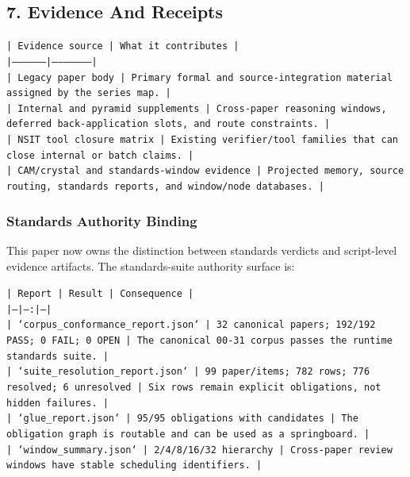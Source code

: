 \documentclass[11pt]{article}
\begin{document}
\subsection*{7. Evidence And Receipts}

\noindent\texttt{| Evidence source | What it contributes |}\\
\noindent\texttt{|-----------------|---------------------|}\\
\noindent\texttt{| Legacy paper body | Primary formal and source-integration material assigned by the series map. |}\\
\noindent\texttt{| Internal and pyramid supplements | Cross-paper reasoning windows, deferred back-application slots, and route constraints. |}\\
\noindent\texttt{| NSIT tool closure matrix | Existing verifier/tool families that can close internal or batch claims. |}\\
\noindent\texttt{| CAM/crystal and standards-window evidence | Projected memory, source routing, standards reports, and window/node databases. |}\\

\subsubsection*{Standards Authority Binding}

This paper now owns the distinction between standards verdicts and script-level
evidence artifacts. The standards-suite authority surface is:

\noindent\texttt{| Report | Result | Consequence |}\\
\noindent\texttt{|---|---:|---|}\\
\noindent\texttt{| `corpus\_conformance\_report.json` | 32 canonical papers; 192/192 PASS; 0 FAIL; 0 OPEN | The canonical 00-31 corpus passes the runtime standards suite. |}\\
\noindent\texttt{| `suite\_resolution\_report.json` | 99 paper/items; 782 rows; 776 resolved; 6 unresolved | Six rows remain explicit obligations, not hidden failures. |}\\
\noindent\texttt{| `glue\_report.json` | 95/95 obligations with candidates | The obligation graph is routable and can be used as a springboard. |}\\
\noindent\texttt{| `window\_summary.json` | 2/4/8/16/32 hierarchy | Cross-paper review windows have stable scheduling identifiers. |}\\
\end{document}
